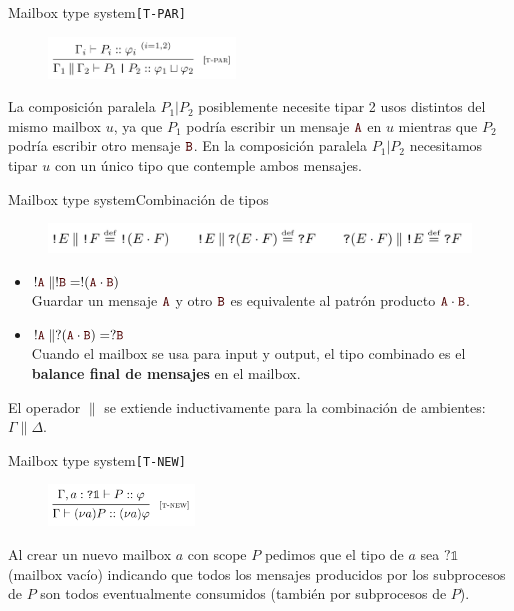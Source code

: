 \documentclass{beamer}
\newcommand{\msgtag}[1]{\texttt{\textcolor{msg-color}{#1}}}
\begin{document}
\begin{frame}{Mailbox type system}{\texttt{[T-PAR]}}
    \begin{figure}[H]
        \includegraphics[height=3em]{typing-rules-t-par}
    \end{figure}

    La composición paralela $P_1 | P_2$ posiblemente necesite tipar 2 usos distintos del mismo mailbox $u$, ya que $P_1$ podría escribir un mensaje $\msgtag{A}$ en $u$ mientras que $P_2$ podría escribir otro mensaje $\msgtag{B}$. En la composición paralela $P_1 | P_2$ necesitamos tipar $u$ con un único tipo que contemple ambos mensajes.
\end{frame}

\begin{frame}{Mailbox type system}{Combinación de tipos}
    \begin{figure}[H]
        \includegraphics[width=\textwidth]{type-combinator}
    \end{figure}

    \begin{itemize}
        \item $!\msgtag{A} \parallel !\msgtag{B} = !(\msgtag{A} \cdot \msgtag{B})$
            \\ Guardar un mensaje $\msgtag{A}$ y otro $\msgtag{B}$ es equivalente al patrón producto $\msgtag{A} \cdot \msgtag{B}$.
        \item $!\msgtag{A} \parallel ?(\msgtag{A} \cdot \msgtag{B}) = ?\msgtag{B}$
            \\ Cuando el mailbox se usa para input y output, el tipo combinado es el \textbf{balance final de mensajes} en el mailbox.
    \end{itemize}
    \vspace{1em}

    El operador $\parallel$ se extiende inductivamente para la combinación de ambientes: $\Gamma \parallel \Delta$.
\end{frame}

\begin{frame}{Mailbox type system}{\texttt{[T-NEW]}}
    \begin{figure}[H]
        \includegraphics[height=3em]{typing-rules-t-new}
    \end{figure}

    Al crear un nuevo mailbox $a$ con scope $P$ pedimos que el tipo de $a$ sea $?\mathbb{1}$ (mailbox vacío) indicando que todos los mensajes producidos por los subprocesos de $P$ son todos eventualmente consumidos (también por subprocesos de $P$).
    \vspace{1em}
\end{frame}
\end{document}
